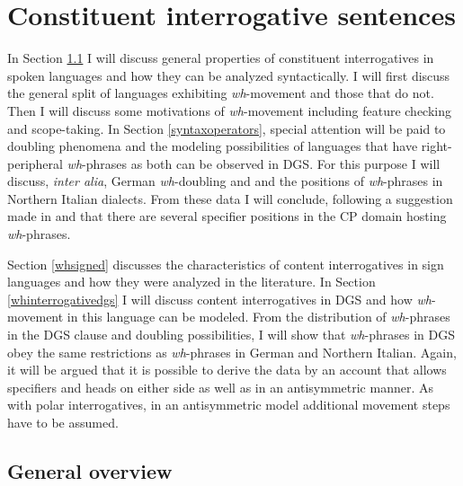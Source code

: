 \section{Constituent interrogative sentences}\label{constint}

In Section \ref{whgeneral} I will discuss general properties of constituent interrogatives in spoken languages and how they can be analyzed syntactically. I will first discuss the general split of languages exhibiting \textit{wh}-movement and those that do not. Then I will discuss some motivations of \textit{wh}-movement including feature checking and scope-taking. In Section \ref{syntaxoperators}, special attention will be paid to doubling phenomena and the modeling possibilities of languages that have right-peripheral \textit{wh}-phrases as both can be observed in DGS. For this purpose I will discuss, \textit{inter alia}, German \textit{wh}-doubling and and the positions of \textit{wh}-phrases in Northern Italian dialects. From these data I will conclude, following a suggestion made in \citet{aboh2010sa} and \citet{van2010complex, van2012you} that there are several specifier positions in the CP domain hosting \textit{wh}-phrases.

Section \ref{whsigned} discusses the characteristics of content interrogatives in sign languages and how they were analyzed in the literature. In Section \ref{whinterrogativedgs} I will discuss content interrogatives in DGS and how \textit{wh}-movement in this language can be modeled. From the distribution of \textit{wh}-phrases in the DGS clause and doubling possibilities, I will show  that \textit{wh}-phrases in DGS obey the same restrictions as \textit{wh}-phrases in German and Northern Italian. Again, it will be argued that it is possible to derive the data by an account that allows specifiers and heads on either side as well as in an antisymmetric manner. As with polar interrogatives, in an antisymmetric model additional movement steps have to be assumed.


\subsection{General overview}\label{whgeneral}
